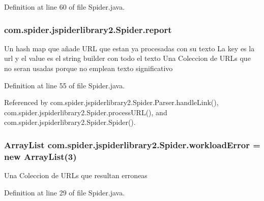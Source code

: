 \-Definition at line 60 of file \-Spider.\-java.

\hypertarget{classcom_1_1spider_1_1jspiderlibrary2_1_1_spider_a234dbec15186b1bc7750700697ef233b}{
\subsubsection[{report}]{ {\bf com.\-spider.\-jspiderlibrary2.\-Spider.\-report}}}\label{classcom_1_1spider_1_1jspiderlibrary2_1_1_spider_a234dbec15186b1bc7750700697ef233b}
\-Un hash map que añade \-U\-R\-L que estan ya procesadas con su texto \-La key es la url y el value es el string builder con todo el texto \-Una \-Coleccion de \-U\-R\-Ls que no seran usadas porque no emplean texto significativo 

\-Definition at line 55 of file \-Spider.\-java.



\-Referenced by com.\-spider.\-jspiderlibrary2.\-Spider.\-Parser.\-handle\-Link(), com.\-spider.\-jspiderlibrary2.\-Spider.\-process\-U\-R\-L(), and com.\-spider.\-jspiderlibrary2.\-Spider.\-Spider().

\hypertarget{classcom_1_1spider_1_1jspiderlibrary2_1_1_spider_aa28c7efd1d89fd2b553833f289946477}{
\subsubsection[{workload\-Error}]{\setlength{\rightskip}{0pt plus 5cm}\-Array\-List {\bf com.\-spider.\-jspiderlibrary2.\-Spider.\-workload\-Error} = new \-Array\-List(3)}}\label{classcom_1_1spider_1_1jspiderlibrary2_1_1_spider_aa28c7efd1d89fd2b553833f289946477}
\-Una \-Coleccion de \-U\-R\-Ls que resultan erroneas 

\-Definition at line 29 of file \-Spider.\-java.



